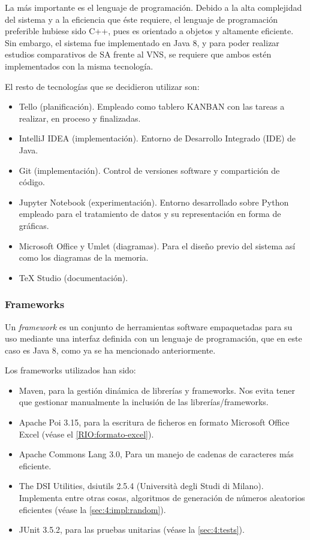 La más importante es el lenguaje de programación. Debido a la alta complejidad del sistema y a la eficiencia que éste requiere, el lenguaje de programación preferible hubiese sido C++, pues es orientado a objetos y altamente eficiente. Sin embargo, el sistema \legacy{} fue implementado en Java 8, y para poder realizar estudios comparativos de SA frente al VNS, se requiere que ambos estén implementados con la misma tecnología.

El resto de tecnologías que se decidieron utilizar son:

\begin{itemize}
	\item Tello (planificación). Empleado como tablero KANBAN con las tareas a realizar, en proceso y finalizadas.
	\item IntelliJ IDEA (implementación). Entorno de Desarrollo Integrado (IDE) de Java.
	\item Git (implementación). Control de versiones software y compartición de código.
	\item Jupyter Notebook (experimentación). Entorno desarrollado sobre Python empleado para el tratamiento de datos y su representación en forma de gráficas.
	\item Microsoft Office y Umlet (diagramas). Para el diseño previo del sistema así como los diagramas de la memoria.
	\item \TeX{} Studio (documentación).
\end{itemize}

\subsubsection{Frameworks}
Un \textit{framework} es un conjunto de herramientas software empaquetadas para su uso mediante una interfaz definida con un lenguaje de programación, que en este caso es Java 8, como ya se ha mencionado anteriormente.

Los frameworks utilizados han sido:

\begin{itemize}
	\item Maven, para la gestión dinámica de librerías y frameworks. Nos evita tener que gestionar manualmente la inclusión de las librerías/frameworks.
	\item Apache Poi 3.15, para la escritura de ficheros en formato Microsoft Office Excel (véase el \ref{RIO:formato-excel}).
	\item Apache Commons Lang 3.0, Para un manejo de cadenas de caracteres más eficiente.
	\item The DSI Utilities, dsiutils 2.5.4 (Università degli Studi di Milano). Implementa entre otras cosas, algoritmos de generación de números aleatorios eficientes (véase la \autoref{sec:4:impl:random}).
	\item JUnit 3.5.2, para las pruebas unitarias (véase la \autoref{sec:4:tests}).
\end{itemize}

